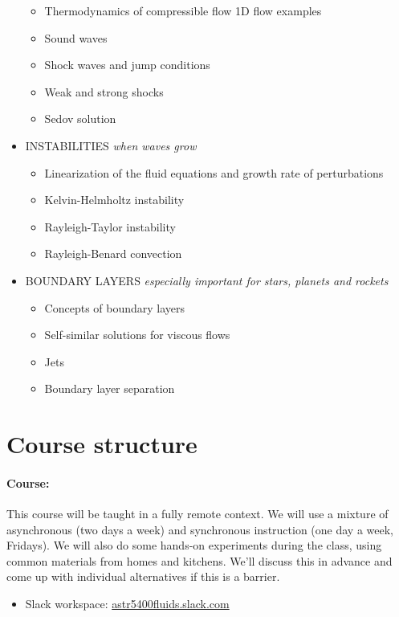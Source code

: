 \documentclass[12pt, preprint]{aastex}
\begin{document}
\begin{itemize}
\begin{itemize}
\item Thermodynamics of compressible flow 1D flow examples
\item Sound waves
\item Shock waves and jump conditions
\item Weak and strong shocks
\item Sedov solution
\end{itemize}
\item INSTABILITIES \emph{when waves grow}
\begin{itemize}
\item Linearization of the fluid equations and growth rate of perturbations
\item Kelvin-Helmholtz instability
\item Rayleigh-Taylor instability
\item Rayleigh-Benard convection
\end{itemize}
\item BOUNDARY LAYERS \emph{especially important for stars, planets and rockets}
\begin{itemize}
\item Concepts of boundary layers
\item  Self-similar solutions for viscous flows
\item Jets
\item Boundary layer separation
\end{itemize}
\end{itemize}


\section*{Course structure}

\paragraph{Course:} This course will be taught in a fully remote context.  We will use a mixture of asynchronous (two days a week) and synchronous instruction (one day a week, Fridays).    We will also do some hands-on experiments during the class, using common materials from homes and kitchens.  We'll discuss this in advance and come up with individual alternatives if this is a barrier.

\begin{itemize}
  \item Slack workspace: \href{astr5400fluids.slack.com}{astr5400fluids.slack.com}
\end{itemize}
\end{document}

